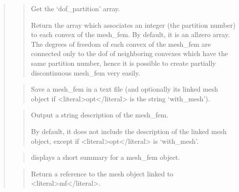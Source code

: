 \documentclass[a4paper,11pt,english]{sphinxmanual}
\begin{document}
\begin{quote}
\begin{quote}
\sphinxAtStartPar
Get the ‘dof\_partition’ array.

\sphinxAtStartPar
Return the array which associates an integer (the partition number)
to each convex of the mesh\_fem. By default, it is an all\sphinxhyphen{}zero array.
The degrees of freedom of each convex of the mesh\_fem are connected
only to the dof of neighboring convexes which have the same
partition number, hence it is possible to create partially
discontinuous mesh\_fem very easily.
\end{quote}

\sphinxAtStartPar
{}
\begin{quote}

\sphinxAtStartPar
Save a mesh\_fem in a text file (and optionally its linked mesh object
if \textless{}literal\textgreater{}opt\textless{}/literal\textgreater{} is the string ‘with\_mesh’).
\end{quote}

\sphinxAtStartPar
{}
\begin{quote}

\sphinxAtStartPar
Output a string description of the mesh\_fem.

\sphinxAtStartPar
By default, it does not include the description of the linked mesh
object, except if \textless{}literal\textgreater{}opt\textless{}/literal\textgreater{} is ‘with\_mesh’.
\end{quote}

\sphinxAtStartPar
{}
\begin{quote}

\sphinxAtStartPar
displays a short summary for a mesh\_fem object.
\end{quote}

\sphinxAtStartPar
{}
\begin{quote}

\sphinxAtStartPar
Return a reference to the mesh object linked to \textless{}literal\textgreater{}mf\textless{}/literal\textgreater{}.
\end{quote}

\sphinxAtStartPar
{}
\begin{quote}


\end{quote}
\end{quote}
\end{document}
